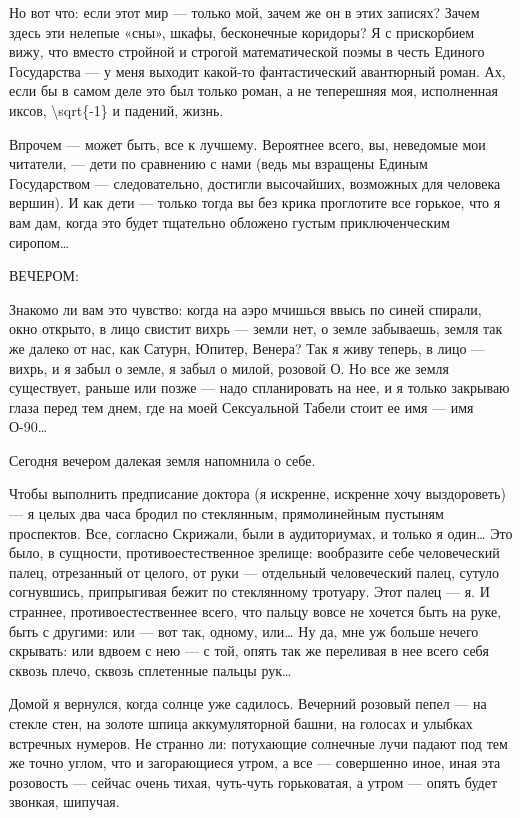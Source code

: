 \documentclass[11pt,openany]{book}
\begin{document}
Но вот что: если этот мир --- только мой, зачем же он в этих записях? Зачем здесь эти нелепые «сны», шкафы, бесконечные коридоры? Я с прискорбием вижу, что вместо стройной и строгой математической поэмы в честь Единого Государства --- у меня выходит какой-то фантастический авантюрный роман. Ах, если бы в самом деле это был только роман, а не теперешняя моя, исполненная иксов, \textbackslash{}sqrt\{-1\} и падений, жизнь.

Впрочем --- может быть, все к лучшему. Вероятнее всего, вы, неведомые мои читатели, --- дети по сравнению с нами (ведь мы взращены Единым Государством --- следовательно, достигли высочайших, возможных для человека вершин). И как дети --- только тогда вы без крика проглотите все горькое, что я вам дам, когда это будет тщательно обложено густым приключенческим сиропом\ldots{}

\begin{center}\textsc{ВЕЧЕРОМ:}\end{center}

Знакомо ли вам это чувство: когда на аэро мчишься ввысь по синей спирали, окно открыто, в лицо свистит вихрь --- земли нет, о земле забываешь, земля так же далеко от нас, как Сатурн, Юпитер, Венера? Так я живу теперь, в лицо --- вихрь, и я забыл о земле, я забыл о милой, розовой О. Но все же земля существует, раньше или позже --- надо спланировать на нее, и я только закрываю глаза перед тем днем, где на моей Сексуальной Табели стоит ее имя --- имя О-90\ldots{}

Сегодня вечером далекая земля напомнила о себе.

Чтобы выполнить предписание доктора (я искренне, искренне хочу выздороветь) --- я целых два часа бродил по стеклянным, прямолинейным пустыням проспектов. Все, согласно Скрижали, были в аудиториумах, и только я один\ldots{} Это было, в сущности, противоестественное зрелище: вообразите себе человеческий палец, отрезанный от целого, от руки --- отдельный человеческий палец, сутуло согнувшись, припрыгивая бежит по стеклянному тротуару. Этот палец --- я. И страннее, противоестественнее всего, что пальцу вовсе не хочется быть на руке, быть с другими: или --- вот так, одному, или\ldots{} Ну да, мне уж больше нечего скрывать: или вдвоем с нею --- с той, опять так же переливая в нее всего себя сквозь плечо, сквозь сплетенные пальцы рук\ldots{}

Домой я вернулся, когда солнце уже садилось. Вечерний розовый пепел --- на стекле стен, на золоте шпица аккумуляторной башни, на голосах и улыбках встречных нумеров. Не странно ли: потухающие солнечные лучи падают под тем же точно углом, что и загорающиеся утром, а все --- совершенно иное, иная эта розовость --- сейчас очень тихая, чуть-чуть горьковатая, а утром --- опять будет звонкая, шипучая.
\end{document}
